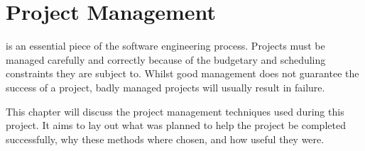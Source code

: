 \chapter[Project Management]{Project Management}
\label{ch:pm}


 is an essential piece of the software engineering process.
Projects must be managed carefully and correctly because of the budgetary and scheduling
constraints they are subject to. Whilst good management does not guarantee the success of
a project, badly managed projects will usually result in failure.

This chapter will discuss the project management techniques used during this project.
It aims to lay out what was planned to help the project be completed successfully, why
these methods where chosen, and how useful they were.

\clearpage
\clearpage
\clearpage
\clearpage
\clearpage
\clearpage
\clearpage
\clearpage
\clearpage
\clearpage
\clearpage
